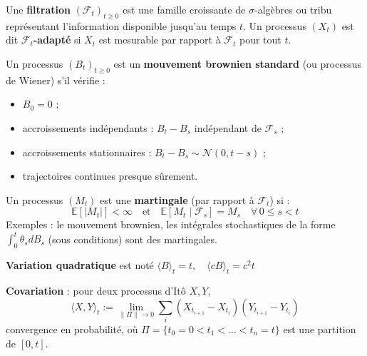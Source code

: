 \begin{f}
	
Une \textbf{filtration} \((\mathcal{F}_t)_{t \geq 0}\) est une famille croissante de \(\sigma\)-algèbres ou tribu représentant l’information disponible jusqu’au temps \(t\). Un processus \((X_t)\) est dit \textbf{\(\mathcal{F}_t\)-adapté} si \(X_t\) est mesurable par rapport à \(\mathcal{F}_t\) pour tout \(t\).
	
Un processus \((B_t)_{t \geq 0}\) est un \textbf{mouvement brownien standard} (ou processus de Wiener) s’il vérifie :
	\begin{itemize} 
		\item \(B_0 = 0\) ;
		\item accroissements indépendants : \(B_t - B_s\)  indépendant de \(\mathcal{F}_s\) ;
		\item accroissements stationnaires : \(B_t - B_s \sim \mathcal{N}(0, t - s)\) ;
		\item trajectoires continues presque sûrement.
	\end{itemize}
	
	Un processus \((M_t)\) est une \textbf{martingale} (par rapport à \(\mathcal{F}_t\)) si :
	\[
	\mathbb{E}[|M_t|] < \infty \quad \text{et} \quad \mathbb{E}[M_t \mid \mathcal{F}_s] = M_s \quad \forall\, 0 \leq s < t
	\]
	Exemples : le mouvement brownien, les intégrales stochastiques de la forme \(\int_0^t \theta_s dB_s\) (sous conditions) sont des martingales.
	\medskip
	
	\textbf{Variation quadratique} est noté \(
	\langle B \rangle_t = t, \quad \langle cB \rangle_t = c^2 t\)
	
\textbf{Covariation} : pour deux processus d’Itô \(X, Y\),
\[
\langle X, Y \rangle_t := \lim_{\|\Pi\| \to 0} \sum_{i} (X_{t_{i+1}} - X_{t_i})(Y_{t_{i+1}} - Y_{t_i})
\]
convergence en probabilité, où \(\Pi = \{t_0 = 0 < t_1 < \dots < t_n = t\}\) est une partition de \([0,t]\).
\end{f}


